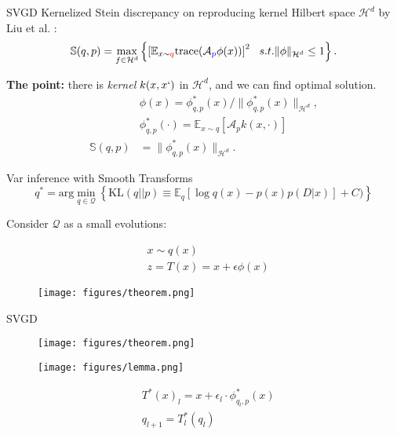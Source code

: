 \documentclass{beamer}
\begin{document}
\begin{frame}{SVGD}
    Kernelized Stein discrepancy on reproducing kernel Hilbert space $\mathcal{H}^d$ by Liu et al. \cite{liu2016kernelized}:
    \begin{equation}
\mathbb{S}(q, p) = \max_{f\in \mathcal{H}^d}\left\{ \left[\mathbb{E}_{x\sim \color{red} q} \text{trace}(\mathcal{A}_{ \color{blue} p}\phi(x))\right]^2 ~~ s.t. \|\phi\|_{\mathcal{H}^d} \leq 1 \right\}.
\end{equation}

 \textbf{The point:} there is \textit{kernel} $k(x, x`)$ in $\mathcal{H}^d$, and we can find optimal solution.
\begin{align}
    &\phi(x) = \phi^*_{q,p}(x)/ \|\phi^*_{q,p}(x)\|_{\mathcal{H}^d}, \\
    &\phi^*_{q,p}(\cdot) = \mathbb{E}_{x\sim q} [\mathcal{A}_p k(x, \cdot )]\\
    \mathbb{S}(q, p)&= \|\phi^*_{q,p}(x)\|_{\mathcal{H}^d}.
\end{align}
\end{frame}

\begin{frame}{Var inference with Smooth Transforms}
\begin{equation}
    q^* = \text{arg} \min_{q \in \mathcal{Q}} \left\{ \text{KL}(q || p) \equiv \mathbb{E}_q[\log q(x) - p(x)p(D|x)] + C )\right\}
\end{equation}

Consider $\mathcal{Q}$ as a small evolutions:

\begin{align}
    &x \sim q(x) \\
    &z = T(x) = x + \epsilon \phi(x)
\end{align}
\begin{figure}
    \centering
    \texttt{[image: figures/theorem.png]}
\end{figure}
\end{frame}

\begin{frame}{SVGD}
\begin{figure}
    \centering
    \texttt{[image: figures/theorem.png]}
\end{figure}
    \begin{figure}
    \centering
    \texttt{[image: figures/lemma.png]}
\end{figure}

\begin{align}
    &T^*(x)_l = x + \epsilon_l \cdot \phi^*_{q_l, p}(x)\\
    &q_{l+1} = T^*_l(q_l)
\end{align}

\end{frame}
\end{document}
